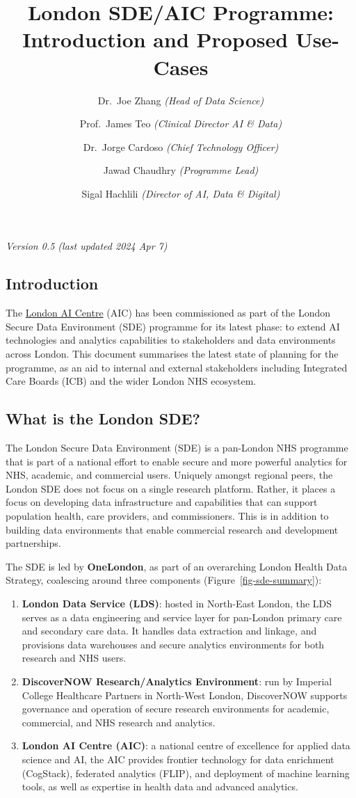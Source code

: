 \documentclass[
  letterpaper,
  DIV=11,
  numbers=noendperiod]{scrartcl}
\title{London SDE/AIC Programme: Introduction and Proposed Use-Cases}
\author{Dr.~Joe Zhang \emph{(Head of Data Science)} \and Prof.~James Teo
\emph{(Clinical Director AI \& Data)} \and Dr.~Jorge Cardoso
\emph{(Chief Technology Officer)} \and Jawad Chaudhry \emph{(Programme
Lead)} \and Sigal Hachlili \emph{(Director of AI, Data \& Digital)}}
\date{}
\begin{document}
\maketitle

\emph{Version 0.5 (last updated 2024 Apr 7)}

\subsection{Introduction}\label{introduction}

The \href{https://www.aicentre.co.uk/}{London AI Centre} (AIC) has been
commissioned as part of the London Secure Data Environment (SDE)
programme for its latest phase: to extend AI technologies and analytics
capabilities to stakeholders and data environments across London. This
document summarises the latest state of planning for the programme, as
an aid to internal and external stakeholders including Integrated Care
Boards (ICB) and the wider London NHS ecosystem.

\subsection{What is the London SDE?}\label{what-is-the-london-sde}

The London Secure Data Environment (SDE) is a pan-London NHS programme
that is part of a national effort to enable secure and more powerful
analytics for NHS, academic, and commercial users. Uniquely amongst
regional peers, the London SDE does not focus on a single research
platform. Rather, it places a focus on developing data infrastructure
and capabilities that can support population health, care providers, and
commissioners. This is in addition to building data environments that
enable commercial research and development partnerships.

The SDE is led by \textbf{OneLondon}, as part of an overarching London
Health Data Strategy, coalescing around three components
(Figure~\ref{fig-sde-summary}):

\begin{enumerate}
\def\labelenumi{(\arabic{enumi})}
\item
  \textbf{London Data Service (LDS)}: hosted in North-East London, the
  LDS serves as a data engineering and service layer for pan-London
  primary care and secondary care data. It handles data extraction and
  linkage, and provisions data warehouses and secure analytics
  environments for both research and NHS users.
\item
  \textbf{DiscoverNOW Research/Analytics Environment}: run by Imperial
  College Healthcare Partners in North-West London, DiscoverNOW supports
  governance and operation of secure research environments for academic,
  commercial, and NHS research and analytics.
\item
  \textbf{London AI Centre (AIC)}: a national centre of excellence for
  applied data science and AI, the AIC provides frontier technology for
  data enrichment (CogStack), federated analytics (FLIP), and deployment
  of machine learning tools, as well as expertise in health data and
  advanced analytics.
\end{enumerate}
\end{document}
